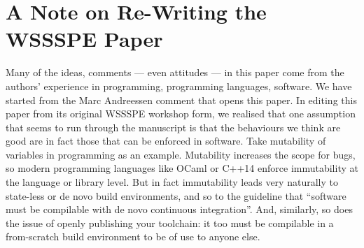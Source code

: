 \documentclass[a4paper,11pt]{article}
\begin{document}
\section*{A Note on Re-Writing the WSSSPE Paper}

Many of the ideas, comments --- even attitudes --- in this paper come
from the authors' experience in programming, programming languages,
software. We have started from the Marc Andreessen comment that opens
this paper. In editing this paper from its original WSSSPE workshop
form, we realised that one assumption that seems to run through the
manuscript is that the behaviours we think are good are in fact those
that can be enforced in software.  Take mutability of variables in
programming as an example. Mutability increases the scope for bugs, so
modern programming languages like OCaml or C++14 enforce immutability
at the language or library level. But in fact immutability leads very
naturally to state-less or de novo build environments, and so to the
guideline that ``software must be compilable with de novo continuous
integration''.  And, similarly, so does the issue of openly publishing
your toolchain: it too must be compilable in a from-scratch build
environment to be of use to anyone else.




\end{document}
